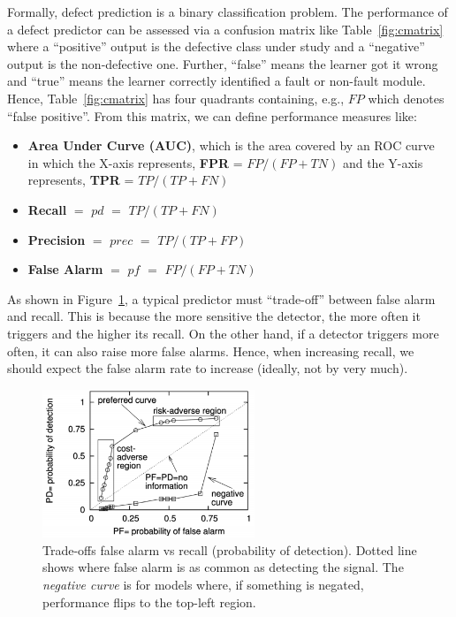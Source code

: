\documentclass[sigconf,review, anonymous]{acmart}
\newcommand{\bi}{\begin{itemize}[leftmargin=0.4cm]}
\newcommand{\ei}{\end{itemize}}
\theoremstyle{break}
\theoremstyle{break}
\begin{document}


Formally, defect prediction is a binary classification problem.
The performance of a defect predictor can be assessed via a  confusion matrix like Table~\ref{fig:cmatrix}
where a ``positive'' output is the defective class under study and a ``negative'' output is the non-defective one.
Further, ``false'' means the learner got it wrong and ``true'' means the learner correctly identified
a fault or non-fault module. Hence, Table~\ref{fig:cmatrix} has four quadrants containing, e.g., $\mathit{FP}$ which denotes ``false positive''. 
From this matrix, we can define performance measures like: 
\bi
\item \textbf{Area Under Curve (AUC)}, which 
is the area covered by an ROC curve~\cite{swets1988measuring, duda2012pattern} in which the X-axis represents, \textbf{FPR} = $\mathit{FP}/(\mathit{FP} + \mathit{TN})$
and the Y-axis represents, \textbf{TPR} = $\mathit{TP}/(\mathit{TP} + \mathit{FN})$

\item \textbf{Recall} $=$ $pd$  $=$ $\mathit{TP}/(\mathit{TP} + \mathit{FN})$


\item  \textbf{Precision}  $=$ $prec$ $=$ $\mathit{TP}/(\mathit{TP} + \mathit{FP})$
 

\item \textbf{False Alarm}  $=$ $pf$ $=$ $\mathit{FP}/(\mathit{FP} + \mathit{TN})$
\ei

As shown in Figure~\ref{fig:trade},
a typical predictor must ``trade-off''
between false alarm and recall.
This is because the  more sensitive the detector, the more often it triggers and the higher its recall. On the other hand,  if a detector triggers more often, it can also raise more false alarms.
Hence, when increasing recall, we  should  expect
the false alarm rate to  increase
(ideally, not by very much).


\begin{figure}[!b]
\begin{center}
\includegraphics[width=2.5in]{roc.png}
\end{center}
\vspace{-0.2cm}
\caption{Trade-offs false alarm vs
recall (probability of detection). Dotted line shows where false alarm is as common as detecting the signal.
The {\em negative curve} is for models where, if something is negated, performance flips  to the top-left region. }\label{fig:trade}
\end{figure}
\end{document}
